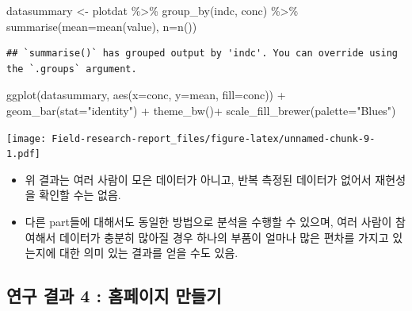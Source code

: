 \documentclass[
]{article}
\newenvironment{Shaded}{\begin{snugshade}}{\end{snugshade}}
\newcommand{\AttributeTok}[1]{\textcolor[rgb]{0.77,0.63,0.00}{#1}}
\newcommand{\FunctionTok}[1]{\textcolor[rgb]{0.00,0.00,0.00}{#1}}
\newcommand{\NormalTok}[1]{#1}
\newcommand{\OtherTok}[1]{\textcolor[rgb]{0.56,0.35,0.01}{#1}}
\newcommand{\SpecialCharTok}[1]{\textcolor[rgb]{0.00,0.00,0.00}{#1}}
\newcommand{\StringTok}[1]{\textcolor[rgb]{0.31,0.60,0.02}{#1}}
\begin{document}
\begin{Shaded}
\begin{Highlighting}[]
\NormalTok{datasummary }\OtherTok{\textless{}{-}}\NormalTok{ plotdat }\SpecialCharTok{\%\textgreater{}\%} 
  \FunctionTok{group\_by}\NormalTok{(indc, conc) }\SpecialCharTok{\%\textgreater{}\%} 
  \FunctionTok{summarise}\NormalTok{(}\AttributeTok{mean=}\FunctionTok{mean}\NormalTok{(value), }\AttributeTok{n=}\FunctionTok{n}\NormalTok{()) }
\end{Highlighting}
\end{Shaded}

\begin{verbatim}
## `summarise()` has grouped output by 'indc'. You can override using the `.groups` argument.
\end{verbatim}

\begin{Shaded}
\begin{Highlighting}[]
\FunctionTok{ggplot}\NormalTok{(datasummary, }\FunctionTok{aes}\NormalTok{(}\AttributeTok{x=}\NormalTok{conc, }\AttributeTok{y=}\NormalTok{mean, }\AttributeTok{fill=}\NormalTok{conc)) }\SpecialCharTok{+}
  \FunctionTok{geom\_bar}\NormalTok{(}\AttributeTok{stat=}\StringTok{"identity"}\NormalTok{) }\SpecialCharTok{+}
  \FunctionTok{theme\_bw}\NormalTok{()}\SpecialCharTok{+}
  \FunctionTok{scale\_fill\_brewer}\NormalTok{(}\AttributeTok{palette=}\StringTok{"Blues"}\NormalTok{)}
\end{Highlighting}
\end{Shaded}

\texttt{[image: Field-research-report\_files/figure-latex/unnamed-chunk-9-1.pdf]}

\begin{itemize}
\item
  위 결과는 여러 사람이 모은 데이터가 아니고, 반복 측정된 데이터가
  없어서 재현성을 확인할 수는 없음.
\item
  다른 part들에 대해서도 동일한 방법으로 분석을 수행할 수 있으며, 여러
  사람이 참여해서 데이터가 충분히 많아질 경우 하나의 부품이 얼마나 많은
  편차를 가지고 있는지에 대한 의미 있는 결과를 얻을 수도 있음.
\end{itemize}

\hypertarget{uxc5f0uxad6c-uxacb0uxacfc-4-uxd648uxd398uxc774uxc9c0-uxb9ccuxb4e4uxae30}{%
\subsection{연구 결과 4 : 홈페이지
만들기}\label{uxc5f0uxad6c-uxacb0uxacfc-4-uxd648uxd398uxc774uxc9c0-uxb9ccuxb4e4uxae30}}
\end{document}
